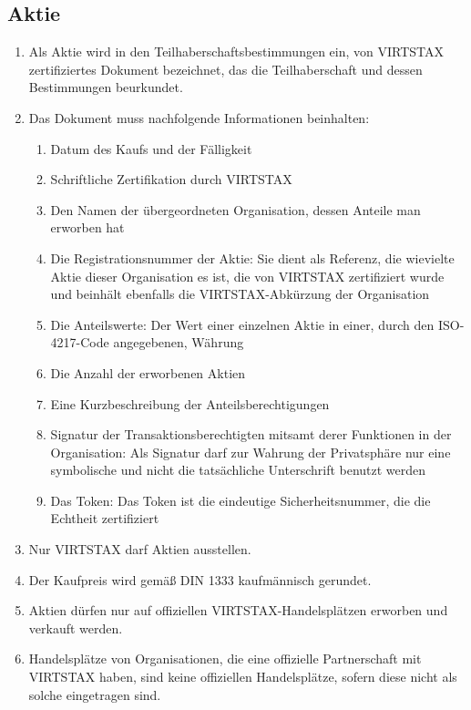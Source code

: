 \documentclass{article}
\begin{document}
\subsection{Aktie}
\begin{enumerate}[(1)]
	\item Als Aktie wird in den Teilhaberschaftsbestimmungen ein, von VIRTSTAX zertifiziertes Dokument bezeichnet, das die Teilhaberschaft und dessen Bestimmungen beurkundet.
	\item Das Dokument muss nachfolgende Informationen beinhalten:
	\begin{enumerate}[1.]
		\item Datum des Kaufs und der Fälligkeit
		\item Schriftliche Zertifikation durch VIRTSTAX
		\item Den Namen der übergeordneten Organisation, dessen Anteile man erworben hat
		\item Die Registrationsnummer der Aktie: Sie dient als Referenz, die wievielte Aktie dieser Organisation es ist, die von VIRTSTAX zertifiziert wurde und beinhält ebenfalls die VIRTSTAX-Abkürzung der Organisation
		\item Die Anteilswerte: Der Wert einer einzelnen Aktie in einer, durch den ISO-4217-Code angegebenen, Währung
		\item Die Anzahl der erworbenen Aktien
		\item Eine Kurzbeschreibung der Anteilsberechtigungen
		\item Signatur der Transaktionsberechtigten mitsamt derer Funktionen in der Organisation: Als Signatur darf zur Wahrung der Privatsphäre nur eine symbolische und nicht die tatsächliche Unterschrift benutzt werden
		\item Das Token: Das Token ist die eindeutige Sicherheitsnummer, die die Echtheit zertifiziert
	\end{enumerate}
	\item Nur VIRTSTAX darf Aktien ausstellen.
	\item Der Kaufpreis wird gemäß DIN 1333 kaufmännisch gerundet.
	\item Aktien dürfen nur auf offiziellen VIRTSTAX-Handelsplätzen erworben und verkauft werden.
	\item Handelsplätze von Organisationen, die eine offizielle Partnerschaft mit VIRTSTAX haben, sind keine offiziellen Handelsplätze, sofern diese nicht als solche eingetragen sind.
\end{enumerate}
\end{document}
